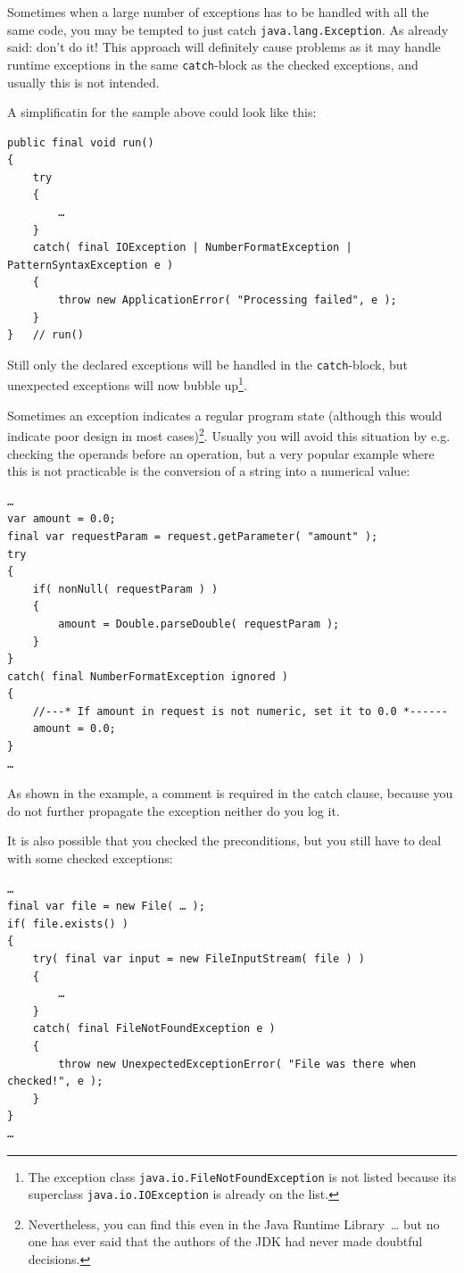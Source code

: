 \documentclass[11pt,a4paper, titlepage, parskip=half, headsepline, footsepline, cleardoublepage=current, headheight=1cm]{scrbook}
\begin{document}
Sometimes when a large number of exceptions has to be handled with all the same code, you may be tempted to just catch \lstinline|java.lang.Exception|. As already said: don't do it! This approach will definitely cause problems as it may handle runtime exceptions in the same \lstinline|catch|-block as the checked exceptions, and usually this is not intended.

A simplificatin for the sample above could look like this:
\begin{lstlisting}
public final void run()
{
    try
    {
        …
    }
    catch( final IOException | NumberFormatException | PatternSyntaxException e )
    {
        throw new ApplicationError( "Processing failed", e );
    }
}   // run()
\end{lstlisting}
Still only the declared exceptions will be handled in the \lstinline|catch|-block, but unexpected exceptions will now bubble up\footnote{The exception class \lstinline|java.io.FileNotFoundException| is not listed because its superclass \lstinline|java.io.IOException| is already on the list.}.

Sometimes an exception indicates a regular program state (although this would indicate poor design in most cases)\footnote{Nevertheless, you can find this even in the Java Runtime Library~… but no one has ever said that the authors of the JDK had never made doubtful decisions.}. Usually you will avoid this situation by e.g. checking the operands before an operation, but a very popular example where this is not practicable is the conversion of a string into a numerical value:
\begin{lstlisting}
…
var amount = 0.0;
final var requestParam = request.getParameter( "amount" );
try
{
    if( nonNull( requestParam ) )
    {
        amount = Double.parseDouble( requestParam );
    }
}
catch( final NumberFormatException ignored )
{
    //---* If amount in request is not numeric, set it to 0.0 *------
    amount = 0.0;
}
…
\end{lstlisting}

As shown in the example, a comment is required in the catch clause, because you do not further propagate the exception neither do you log it.

It is also possible that you checked the preconditions, but you still have to deal with some checked exceptions:
\begin{lstlisting}
…
final var file = new File( … );
if( file.exists() )
{
    try( final var input = new FileInputStream( file ) )
    {
        …
    }
    catch( final FileNotFoundException e )
    {
        throw new UnexpectedExceptionError( "File was there when checked!", e );
    }
}
…
\end{lstlisting}
\end{document}
